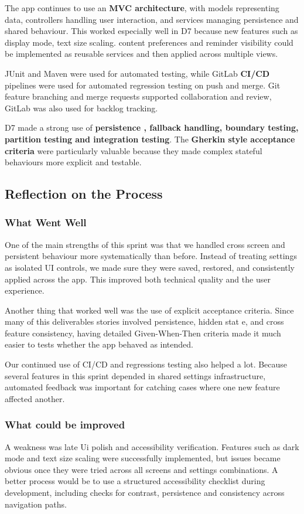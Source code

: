 \documentclass[a4paper, 12pt]{article}
\begin{document}
    The app continues to use an \textbf{MVC architecture}, with models
    representing data, controllers handling user interaction, and services
    managing persistence and shared behaviour. This worked especially well in D7
    because new features such as display mode, text size scaling. content preferences
    and reminder visibility could be implemented as reusable services and then applied
    across multiple views.

    JUnit and Maven were used for automated testing, while GitLab \textbf{CI/CD}
    pipelines were used for automated regression testing on push and merge. Git
    feature branching and merge requests supported collaboration and review, GitLab
    was also used for backlog tracking.

    D7 made a strong use of \textbf{persistence , fallback handling, boundary testing,
    partition testing and integration testing}. The \textbf{Gherkin style
    acceptance criteria} were particularly valuable because they made complex
    stateful behaviours more explicit and testable.
    \subsection{Reflection on the Process}

    \subsubsection{What Went Well}
    One of the main strengths of this sprint was that we handled cross screen
    and persistent behaviour more systematically than before. Instead of treating
    settings as isolated UI controls, we made sure they were saved, restored,
    and consistently applied across the app. This improved both technical quality
    and the user experience.

    Another thing that worked well was the use of explicit acceptance criteria.
    Since many of this deliverables stories involved persistence, hidden stat e,
    and cross feature consistency, having detailed Given-When-Then criteria made
    it much easier to tests whether the app behaved as intended.

    Our continued use of CI/CD and regressions testing also helped a lot.
    Because several features in this sprint depended in shared settings
    infrastructure, automated feedback was important for catching cases where one
    new feature affected another.
    \subsubsection{What could be improved}

    A weakness was late Ui polish and accessibility verification. Features such
    as dark mode and text size scaling were successfully implemented, but issues
    became obvious once they were tried across all screens and settings combinations.
    A better process would be to use a structured accessibility checklist during
    development, including checks for contrast, persistence and consistency
    across navigation paths.
\end{document}
